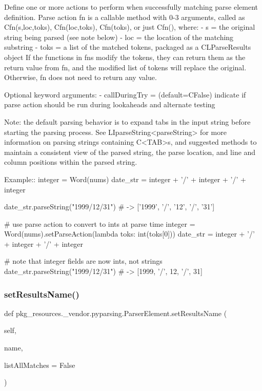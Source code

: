 \begin{DoxyVerb}Define one or more actions to perform when successfully matching parse element definition.
Parse action fn is a callable method with 0-3 arguments, called as C{fn(s,loc,toks)},
C{fn(loc,toks)}, C{fn(toks)}, or just C{fn()}, where:
 - s   = the original string being parsed (see note below)
 - loc = the location of the matching substring
 - toks = a list of the matched tokens, packaged as a C{L{ParseResults}} object
If the functions in fns modify the tokens, they can return them as the return
value from fn, and the modified list of tokens will replace the original.
Otherwise, fn does not need to return any value.

Optional keyword arguments:
 - callDuringTry = (default=C{False}) indicate if parse action should be run during lookaheads and alternate testing

Note: the default parsing behavior is to expand tabs in the input string
before starting the parsing process.  See L{I{parseString}<parseString>} for more information
on parsing strings containing C{<TAB>}s, and suggested methods to maintain a
consistent view of the parsed string, the parse location, and line and column
positions within the parsed string.

Example::
    integer = Word(nums)
    date_str = integer + '/' + integer + '/' + integer

    date_str.parseString("1999/12/31")  # -> ['1999', '/', '12', '/', '31']

    # use parse action to convert to ints at parse time
    integer = Word(nums).setParseAction(lambda toks: int(toks[0]))
    date_str = integer + '/' + integer + '/' + integer

    # note that integer fields are now ints, not strings
    date_str.parseString("1999/12/31")  # -> [1999, '/', 12, '/', 31]
\end{DoxyVerb}
 \mbox{\label{classpkg__resources_1_1__vendor_1_1pyparsing_1_1ParserElement_a787aafab87357373be31819f83517344}} 
\subsubsection{\texorpdfstring{set\+Results\+Name()}{setResultsName()}}
{\footnotesize\ttfamily def pkg\+\_\+resources.\+\_\+vendor.\+pyparsing.\+Parser\+Element.\+set\+Results\+Name (\begin{DoxyParamCaption}\item[{}]{self,  }\item[{}]{name,  }\item[{}]{list\+All\+Matches = {\ttfamily False} }\end{DoxyParamCaption})}

